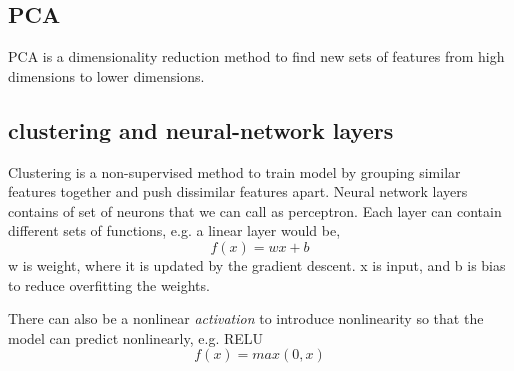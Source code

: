 \subsection{PCA}
PCA is a dimensionality reduction method to find new sets of features from high dimensions to lower dimensions. 


\subsection{clustering and neural-network layers}
Clustering is a non-supervised method to train model by grouping similar features together and push dissimilar features apart. 
Neural network layers contains of set of neurons that we can call as perceptron. Each layer can contain different sets of functions, e.g. a linear layer would be,
\begin{equation}
    f(x) = wx + b
\end{equation}
w is weight, where it is updated by the gradient descent. x is input, and b is bias to reduce overfitting the weights.

There can also be a nonlinear \textit{activation} to introduce nonlinearity so that the model can predict nonlinearly, e.g. RELU
\begin{equation}
    f(x) = max(0, x)
\end{equation}




